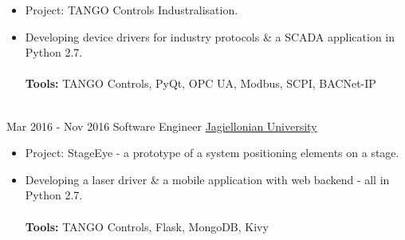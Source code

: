 \documentclass[letterpaper]{twentysecondcv} %
\begin{document}
\begin{twenty}
        {}
        {
        {\begin{itemize}
        \item Project: TANGO Controls Industralisation.
        \item Developing device drivers for industry protocols \& a SCADA application in Python 2.7.
        \\\\
        \textbf{Tools:} TANGO Controls, PyQt, OPC UA, Modbus, SCPI, BACNet-IP
    \end{itemize}}
        }
     \\
     \twentyitem
   		{Mar 2016 -}
		{Nov 2016}
        {Software Engineer}
        {\href{http://www.fais.uj.edu.pl/en\_GB/homepage}{Jagiellonian University}}
        {}
        {
        \begin{itemize}
        \item Project: StageEye - a prototype of a system positioning elements on a stage.
        \item Developing a laser driver \& a mobile application with web backend - all in Python 2.7.
        \\\\
        \textbf{Tools:} TANGO Controls, Flask, MongoDB, Kivy
    \end{itemize}
    	}
        
\end{twenty}

\end{document}
